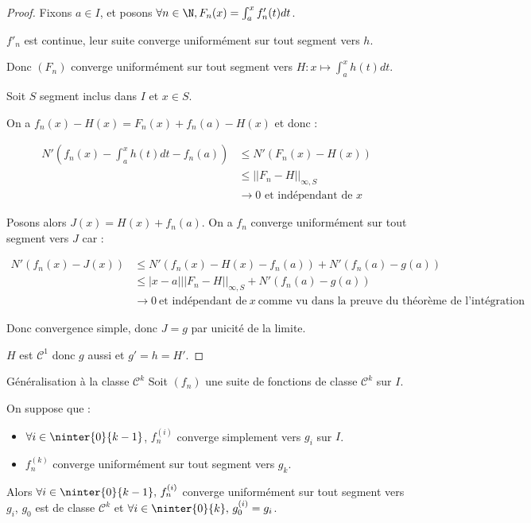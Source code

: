 \begin{proof}
    Fixons $a \in I$, et posons $\forall n \in \N, F_n(x) = \int_{a}^{x } f_n'(t) dt$.

    $f'_n$ est continue, leur suite converge uniformément sur tout segment vers $h$. 

    Donc $(F_n)$ converge uniformément sur tout segment vers $H : x \mapsto \int_a^x h(t) dt$.

    \avspace Soit $S$ segment inclus dans $I$ et $x \in S$. 
    
    On a $f_n(x) - H(x) = F_n(x) + f_n(a) - H(x)$ et donc :

    \begin{align*}
        N'(f_n(x) - \int_{a }^{x } h(t) dt - f_n(a)) & \leqslant N'(F_n(x) - H(x)) \\
        & \leqslant ||F_n - H||_{\infty, S} \\
        & \to 0 \text{ et indépendant de } x
    \end{align*}

    Posons alors $J(x) = H(x) + f_n(a)$. On a $f_n$ converge uniformément sur tout segment vers 
    $J$ car :
    
    \begin{align*}
        N'(f_n(x) - J(x)) & \leqslant N'(f_n(x) - H(x) - f_n(a)) + N'(f_n(a) - g(a)) \\
        & \leqslant |x - a| ||F_n - H||_{\infty, S} + N'(f_n(a) - g(a)) \\
        & \to 0 ~ \text{et indépendant de} ~ x ~ \text{comme vu dans la preuve du théorème de l'intégration}
    \end{align*}

    Donc convergence simple, donc $J = g$ par unicité de la limite. 

    $H$ est $\mathscr {C}^1$ donc $g$ aussi et $g' = h = H'$.
\end{proof}

\begin{theoreme}{Généralisation à la classe $\mathscr{C}^k$}{}
    Soit $(f_n)$ une suite de fonctions de classe $\mathscr{C}^k$ sur $I$. 

    On suppose que :
    \begin{itemize}
        \item $\forall i \in \ninter{0}{k - 1}$,
        $f_n^{(i)}$ converge simplement vers $g_i$ sur $I$.
        \item $f_n^{(k)}$ converge uniformément sur tout segment vers $g_k$.
    \end{itemize}

    Alors $\forall i \in \ninter{0}{k - 1}, \, f_n^{(i)}$ converge uniformément sur tout segment vers $g_i$,
    $g_0$ est de classe $\mathscr{C}^k$ et $\forall i \in \ninter{0}{k}, \, g_0^{(i)} = g_i$.
\end{theoreme}

